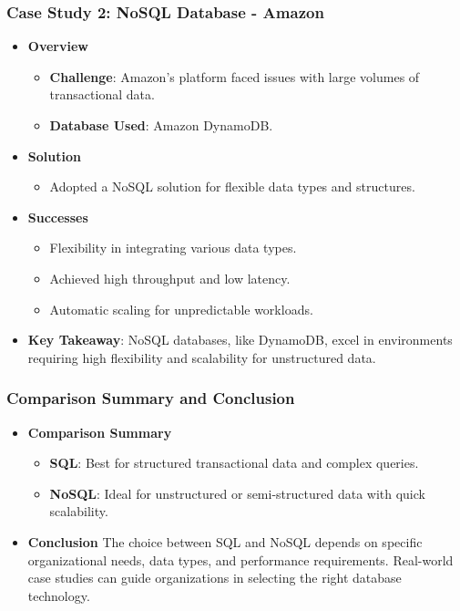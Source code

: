 \documentclass[aspectratio=169]{beamer}
\begin{document}
\begin{frame}[fragile]
    \frametitle{Case Study 2: NoSQL Database - Amazon}
    \begin{itemize}
        \item \textbf{Overview}
            \begin{itemize}
                \item \textbf{Challenge}: Amazon's platform faced issues with large volumes of transactional data.
                \item \textbf{Database Used}: Amazon DynamoDB.
            \end{itemize}
        \item \textbf{Solution}
            \begin{itemize}
                \item Adopted a NoSQL solution for flexible data types and structures.
            \end{itemize}
        \item \textbf{Successes}
            \begin{itemize}
                \item Flexibility in integrating various data types.
                \item Achieved high throughput and low latency.
                \item Automatic scaling for unpredictable workloads.
            \end{itemize}
        \item \textbf{Key Takeaway}: NoSQL databases, like DynamoDB, excel in environments requiring high flexibility and scalability for unstructured data.
    \end{itemize}
\end{frame}

\begin{frame}
    \frametitle{Comparison Summary and Conclusion}
    \begin{itemize}
        \item \textbf{Comparison Summary}
            \begin{itemize}
                \item \textbf{SQL}: Best for structured transactional data and complex queries.
                \item \textbf{NoSQL}: Ideal for unstructured or semi-structured data with quick scalability.
            \end{itemize}
        \item \textbf{Conclusion}
            The choice between SQL and NoSQL depends on specific organizational needs, data types, and performance requirements. Real-world case studies can guide organizations in selecting the right database technology.
    \end{itemize}
\end{frame}
\end{document}
